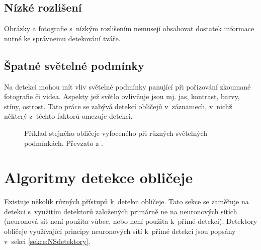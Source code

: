 \subsection*{Nízké rozlišení}
Obrázky a fotografie s~nízkým rozlišením nemusejí obsahovat dostatek informace nutné ke správnemu detekování tváře.

\subsection*{Špatné světelné podmínky}
Na detekci mohou mít vliv světelné podmínky panující při pořizování zkoumané fotografie či videa. Aspekty jež světlo ovlivňuje jsou mj. jas, kontrast, barvy, stíny, ostrost. Tato práce se zabývá detekcí obličejů v~záznamech, v~nichž některý z~těchto faktorů omezuje detekci.


\begin{figure}[H]
  \begin{center}
  \label{illuminationexample}
  \caption{Příklad stejného obličeje vyfoceného při různých světelných podmínkách. Převzato z \cite{feature-based-fd-review}.}
  \end{center}
\end{figure}

\section{Algoritmy detekce obličeje}
\label{sekce:detektory_bez_neuronovych_siti}
Existuje několik různých přístupů k~detekci obličeje. Tato sekce se zaměřuje na detekci s~využitím detektorů založených primárně ne na neuronových sítích (neuronová síť není použita vůbec, nebo není použita k~přímé detekci). Detektory obličeje využívající principy neuronových sítí k~přímé detekci jsou popsány v~sekci \ref{sekce:NSdetektory}.

